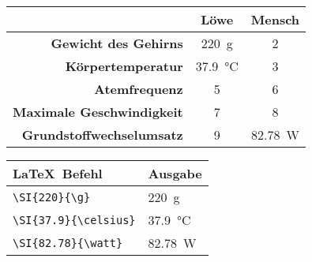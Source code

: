 \documentclass["WS\space 16-17\space -\space LaTeX-Kurs\space -\space Praesentation\space -\space 3.tex"]{subfiles}
\begin{document}
\begin{frame}[fragile]
\Losung
	\begin{outputbox}
		\begin{center}
			\begin{tabular}{r|cc}
				\hline
				&	\textbf{Löwe}										& \textbf{Mensch} 						\\ \hline
				\textbf{Gewicht des Gehirns}		&	\SI{220}{\g}										& 2			\\ 
				\textbf{Körpertemperatur}			&	\SI{37.9}{\celsius}							& 3	\\
				\textbf{Atemfrequenz}				&	5								& 6 					\\
				\textbf{Maximale Geschwindigkeit}	&	7								& 8				\\ 
				\textbf{Grundstoffwechselumsatz}	& 9	&  \SI{82.78}{\watt}\\
				\hline
			\end{tabular}
		\end{center}
	\end{outputbox}
			\begin{center}
			\begin{tabular}{ll}
				\toprule
				\LaTeX\ Befehl						&	Ausgabe						\\ \midrule
				\lstinline|\SI{220}{\g}|			&	\SI{220}{\g}					\\
				\lstinline|\SI{37.9}{\celsius}|		&	\SI{37.9}{\celsius}			\\
				\lstinline|\SI{82.78}{\watt}|		&	\SI{82.78}{\watt}			\\
				\bottomrule
			\end{tabular}
		\end{center}
	
	
	
\end{frame}
\end{document}
